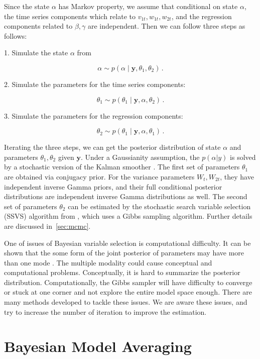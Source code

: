Since the state $\alpha$ has Markov property, we assume that conditional on state $\alpha$, the time series components which relate to $v_{1t},w_{1t},w_{2t}$, and the regression components related to $\beta, \gamma$ are independent. Then we can follow three steps as follows:


1. Simulate the state $\alpha$ from 


$$\alpha \sim p(\alpha \mid \mathbf{y}, \theta_1, \theta_2) \, .$$


2. Simulate the parameters for the time series components:


$$\theta_1 \sim  p(\theta_1  \mid \mathbf{y},\alpha,  \theta_2) \, .$$


3. Simulate the parameters for the regression components:

$$\theta_2 \sim  p(\theta_1  \mid \mathbf{y},\alpha,  \theta_1) \, . $$




Iterating the three steps, we can get the posterior distribution of state $\alpha$ and parameters $\theta_1, \theta_2$ given $\mathbf{y}$. Under a Gaussianity assumption, the $p(\alpha|y)$ is solved by a stochastic version of the Kalman smoother \cite{Durbin2002}. The first set of parameters $\theta_1$ are obtained via conjugacy prior. For the variance parameters $ W_{t}, W_{2t}$, they have  independent inverse Gamma priors, and their full conditional posterior distributions are independent inverse Gamma distributions as well. The second set of parameters $\theta_2$ can be estimated by the stochastic search variable selection (SSVS) algorithm from , which uses a Gibbs sampling algorithm.  Further details are discussed in~\cref{sec:mcmc}.

One of issues of Bayesian variable selection is computational difficulty. It can be shown that the some form of the joint posterior of parameters may have more than one mode \cite{Park2008}. The multiple modality could cause conceptual and computational problems. Conceptually, it is hard to summarize the posterior distribution. Computationally, the Gibbs sampler will have difficulty to converge or stuck at one corner and not explore the entire model space enough. There are many methods developed to tackle these issues\cite{Ishwaran2005}. We are aware these issues, and try to increase the number of iteration to improve the estimation.



\section{Bayesian Model Averaging}







